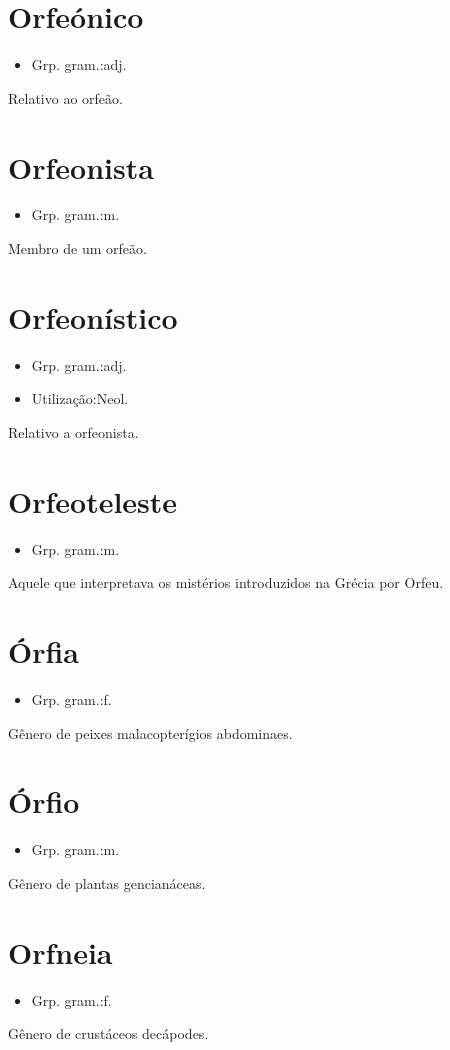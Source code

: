 \section{Orfeónico}
\begin{itemize}
\item {Grp. gram.:adj.}
\end{itemize}
Relativo ao orfeão.
\section{Orfeonista}
\begin{itemize}
\item {Grp. gram.:m.}
\end{itemize}
Membro de um orfeão.
\section{Orfeonístico}
\begin{itemize}
\item {Grp. gram.:adj.}
\end{itemize}
\begin{itemize}
\item {Utilização:Neol.}
\end{itemize}
Relativo a orfeonista.
\section{Orfeoteleste}
\begin{itemize}
\item {Grp. gram.:m.}
\end{itemize}
Aquele que interpretava os mistérios introduzidos na Grécia por Orfeu.
\section{Órfia}
\begin{itemize}
\item {Grp. gram.:f.}
\end{itemize}
Gênero de peixes malacopterígios abdominaes.
\section{Órfio}
\begin{itemize}
\item {Grp. gram.:m.}
\end{itemize}
Gênero de plantas gencianáceas.
\section{Orfneia}
\begin{itemize}
\item {Grp. gram.:f.}
\end{itemize}
Gênero de crustáceos decápodes.
